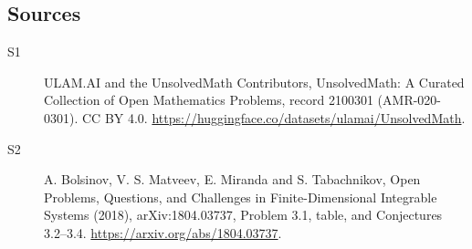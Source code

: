 \documentclass[11pt]{article}
\begin{document}
\subsection{Sources}
\begin{description}
\item[\hypertarget{source:2100301:1}{S1}] ULAM.AI and the UnsolvedMath Contributors, UnsolvedMath: A Curated Collection of Open Mathematics Problems, record 2100301 (AMR-020-0301). CC BY 4.0. \url{https://huggingface.co/datasets/ulamai/UnsolvedMath}.
\item[\hypertarget{source:2100301:2}{S2}] A. Bolsinov, V. S. Matveev, E. Miranda and S. Tabachnikov, Open Problems, Questions, and Challenges in Finite-Dimensional Integrable Systems (2018), arXiv:1804.03737, Problem 3.1, table, and Conjectures 3.2–3.4. \url{https://arxiv.org/abs/1804.03737}.
\end{description}
\label{end:2100301}
\end{document}
